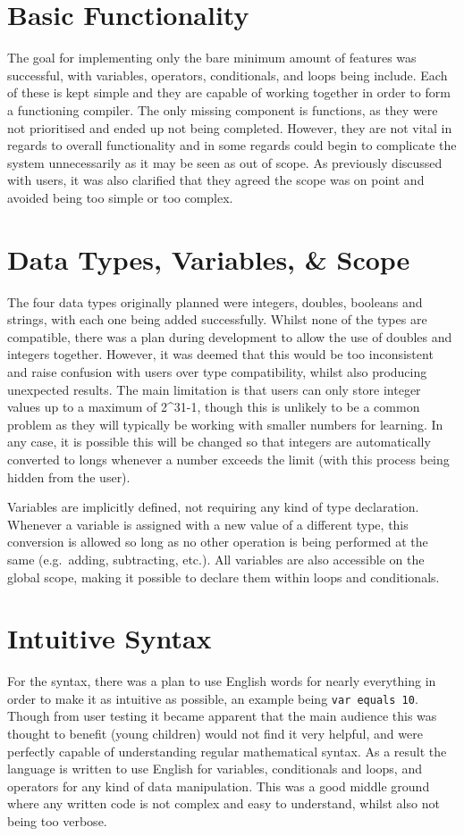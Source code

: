 \documentclass[
]{report}
\begin{document}
\section{Basic Functionality}
The goal for implementing only the bare minimum amount of features was
successful, with variables, operators, conditionals, and loops being
include. Each of these is kept simple and they are capable of working
together in order to form a functioning compiler. The only missing
component is functions, as they were not prioritised and ended up not
being completed. However, they are not vital in regards to overall
functionality and in some regards could begin to complicate the system
unnecessarily as it may be seen as out of scope. As previously discussed
with users, it was also clarified that they agreed the scope was on
point and avoided being too simple or too complex.

\section{Data Types, Variables, \& Scope}
The four data types originally planned were integers, doubles, booleans
and strings, with each one being added successfully. Whilst none of the
types are compatible, there was a plan during development to allow the
use of doubles and integers together. However, it was deemed that this
would be too inconsistent and raise confusion with users over type
compatibility, whilst also producing unexpected results. The main
limitation is that users can only store integer values up to a maximum
of 2\^{}31-1, though this is unlikely to be a common problem as they
will typically be working with smaller numbers for learning. In any
case, it is possible this will be changed so that integers are
automatically converted to longs whenever a number exceeds the limit
(with this process being hidden from the user).

Variables are implicitly defined, not requiring any kind of type
declaration. Whenever a variable is assigned with a new value of a
different type, this conversion is allowed so long as no other operation
is being performed at the same (e.g.~adding, subtracting, etc.). All
variables are also accessible on the global scope, making it possible to
declare them within loops and conditionals.

\section{Intuitive Syntax}
For the syntax, there was a plan to use English words for nearly
everything in order to make it as intuitive as possible, an example
being \texttt{var\ equals\ 10}. Though from user testing it became
apparent that the main audience this was thought to benefit (young
children) would not find it very helpful, and were perfectly capable of
understanding regular mathematical syntax. As a result the language is
written to use English for variables, conditionals and loops, and
operators for any kind of data manipulation. This was a good middle
ground where any written code is not complex and easy to understand,
whilst also not being too verbose.
\end{document}
